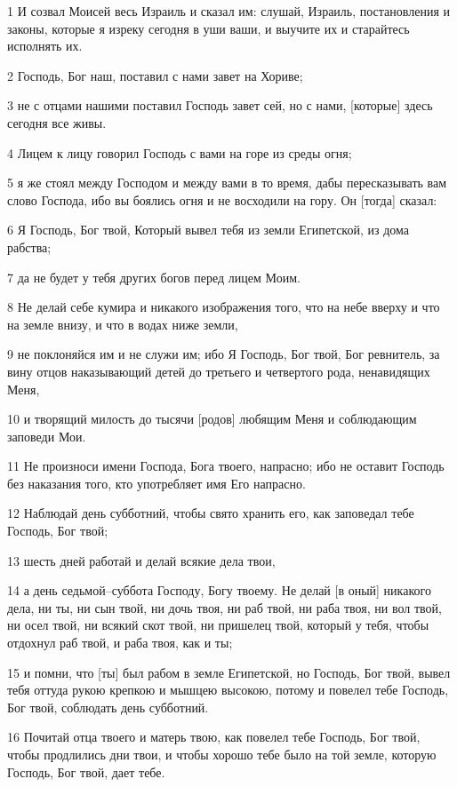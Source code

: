 \par 1 И созвал Моисей весь Израиль и сказал им: слушай, Израиль, постановления и законы, которые я изреку сегодня в уши ваши, и выучите их и старайтесь исполнять их.
\par 2 Господь, Бог наш, поставил с нами завет на Хориве;
\par 3 не с отцами нашими поставил Господь завет сей, но с нами, [которые] здесь сегодня все живы.
\par 4 Лицем к лицу говорил Господь с вами на горе из среды огня;
\par 5 я же стоял между Господом и между вами в то время, дабы пересказывать вам слово Господа, ибо вы боялись огня и не восходили на гору. Он [тогда] сказал:
\par 6 Я Господь, Бог твой, Который вывел тебя из земли Египетской, из дома рабства;
\par 7 да не будет у тебя других богов перед лицем Моим.
\par 8 Не делай себе кумира и никакого изображения того, что на небе вверху и что на земле внизу, и что в водах ниже земли,
\par 9 не поклоняйся им и не служи им; ибо Я Господь, Бог твой, Бог ревнитель, за вину отцов наказывающий детей до третьего и четвертого рода, ненавидящих Меня,
\par 10 и творящий милость до тысячи [родов] любящим Меня и соблюдающим заповеди Мои.
\par 11 Не произноси имени Господа, Бога твоего, напрасно; ибо не оставит Господь без наказания того, кто употребляет имя Его напрасно.
\par 12 Наблюдай день субботний, чтобы свято хранить его, как заповедал тебе Господь, Бог твой;
\par 13 шесть дней работай и делай всякие дела твои,
\par 14 а день седьмой--суббота Господу, Богу твоему. Не делай [в оный] никакого дела, ни ты, ни сын твой, ни дочь твоя, ни раб твой, ни раба твоя, ни вол твой, ни осел твой, ни всякий скот твой, ни пришелец твой, который у тебя, чтобы отдохнул раб твой, и раба твоя, как и ты;
\par 15 и помни, что [ты] был рабом в земле Египетской, но Господь, Бог твой, вывел тебя оттуда рукою крепкою и мышцею высокою, потому и повелел тебе Господь, Бог твой, соблюдать день субботний.
\par 16 Почитай отца твоего и матерь твою, как повелел тебе Господь, Бог твой, чтобы продлились дни твои, и чтобы хорошо тебе было на той земле, которую Господь, Бог твой, дает тебе.
